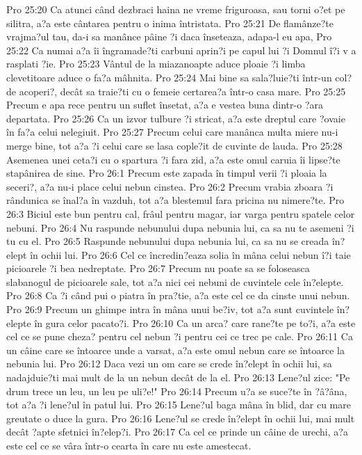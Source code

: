 Pro 25:20  Ca atunci când dezbraci haina ne vreme friguroasa, sau torni o?et pe silitra, a?a este cântarea pentru o inima întristata.
Pro 25:21  De flamânze?te vrajma?ul tau, da-i sa manânce pâine ?i daca înseteaza, adapa-l eu apa,
Pro 25:22  Ca numai a?a îi îngramade?ti carbuni aprin?i pe capul lui ?i Domnul î?i v a rasplati ?ie.
Pro 25:23  Vântul de la miazanoapte aduce ploaie ?i limba clevetitoare aduce o fa?a mâhnita.
Pro 25:24  Mai bine sa sala?luie?ti într-un col? de acoperi?, decât sa traie?ti cu o femeie certarea?a într-o casa mare.
Pro 25:25  Precum e apa rece pentru un suflet însetat, a?a e vestea buna dintr-o ?ara departata.
Pro 25:26  Ca un izvor tulbure ?i stricat, a?a este dreptul care ?ovaie în fa?a celui nelegiuit.
Pro 25:27  Precum celui care manânca multa miere nu-i merge bine, tot a?a ?i celui care se lasa cople?it de cuvinte de lauda.
Pro 25:28  Asemenea unei ceta?i cu o spartura ?i fara zid, a?a este omul caruia îi lipse?te stapânirea de sine.
Pro 26:1  Precum este zapada în timpul verii ?i ploaia la seceri?, a?a nu-i place celui nebun cinstea.
Pro 26:2  Precum vrabia zboara ?i rândunica se înal?a în vazduh, tot a?a blestemul fara pricina nu nimere?te.
Pro 26:3  Biciul este bun pentru cal, frâul pentru magar, iar varga pentru spatele celor nebuni.
Pro 26:4  Nu raspunde nebunului dupa nebunia lui, ca sa nu te asemeni ?i tu cu el.
Pro 26:5  Raspunde nebunului dupa nebunia lui, ca sa nu se creada în?elept în ochii lui.
Pro 26:6  Cel ce încredin?eaza solia în mâna celui nebun î?i taie picioarele ?i bea nedreptate.
Pro 26:7  Precum nu poate sa se foloseasca slabanogul de picioarele sale, tot a?a nici cei nebuni de cuvintele cele în?elepte.
Pro 26:8  Ca ?i când pui o piatra în pra?tie, a?a este cel ce da cinste unui nebun.
Pro 26:9  Precum un ghimpe intra în mâna unui be?iv, tot a?a sunt cuvintele în?elepte în gura celor pacato?i.
Pro 26:10  Ca un arca? care rane?te pe to?i, a?a este cel ce se pune cheza? pentru cel nebun ?i pentru cei ce trec pe cale.
Pro 26:11  Ca un câine care se întoarce unde a varsat, a?a este omul nebun care se întoarce la nebunia lui.
Pro 26:12  Daca vezi un om care se crede în?elept în ochii lui, sa nadajduie?ti mai mult de la un nebun decât de la el.
Pro 26:13  Lene?ul zice: "Pe drum trece un leu, un leu pe uli?e!"
Pro 26:14  Precum u?a se suce?te în ?â?âna, tot a?a ?i lene?ul în patul lui.
Pro 26:15  Lene?ul baga mâna în blid, dar cu mare greutate o duce la gura.
Pro 26:16  Lene?ul se crede în?elept în ochii lui, mai mult decât ?apte sfetnici în?elep?i.
Pro 26:17  Ca cel ce prinde un câine de urechi, a?a este cel ce se vâra într-o cearta în care nu este amestecat.
